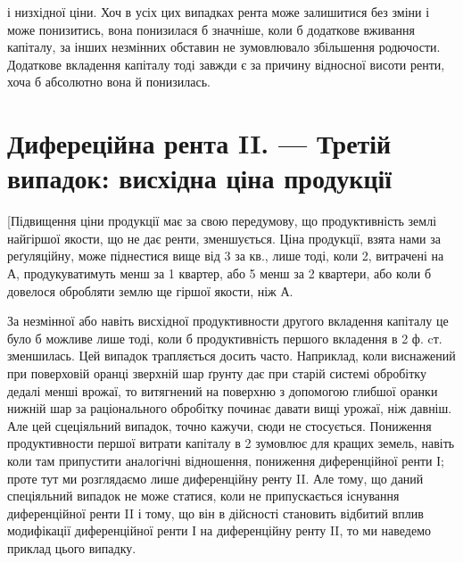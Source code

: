 \parcont{}  %
і низхідної ціни. Хоч в усіх цих випадках рента може залишитися без зміни
і може понизитись, вона понизилася б значніше, коли б додаткове вживання
капіталу, за інших незмінних обставин не зумовлювало збільшення родючости. Додаткове вкладення
капіталу тоді завжди є за причину відносної висоти ренти,
хоча б абсолютно вона й понизилась.

\section{Дифереційна рента II. — Третій випадок:
висхідна ціна продукції}

[Підвищення ціни продукції має за свою передумову, що продуктивність землі
найгіршої якости, що не дає ренти, зменшується. Ціна продукції, взята нами за
реґуляційну, може піднестися вище від 3 за кв., лише тоді, коли 2,
витрачені на А, продукуватимуть менш за 1 квартер, або 5 менш за
2 квартери, або коли б довелося обробляти землю ще гіршої якости, ніж А.

За незмінної або навіть висхідної продуктивности другого вкладення капіталу
це було б можливе лише тоді, коли б продуктивність першого вкладення в 2 ф. cт.
зменшилась. Цей випадок трапляється досить часто. Наприклад, коли виснажений
при поверховій оранці зверхній шар ґрунту дає при старій системі обробітку
дедалі менші врожаї, то витягнений на поверхню з допомогою глибшої
оранки нижній шар за раціонального обробітку починає давати вищі
урожаї, ніж давніш. Але цей сцеціяльний випадок, точно кажучи, сюди не
стосується. Пониження продуктивности першої витрати капіталу в 2 зумовлює для кращих
земель, навіть коли там припустити аналогічні відношення,
пониження диференційної ренти І; проте тут ми розглядаємо лише диференційну
ренту II. Але тому, що даний спеціяльний випадок не може статися, коли не
припускається існування диференційної ренти II і тому, що він в дійсності
становить відбитий вплив модифікації диференційної ренти І на диференційну
ренту II, то ми наведемо приклад цього випадку.


